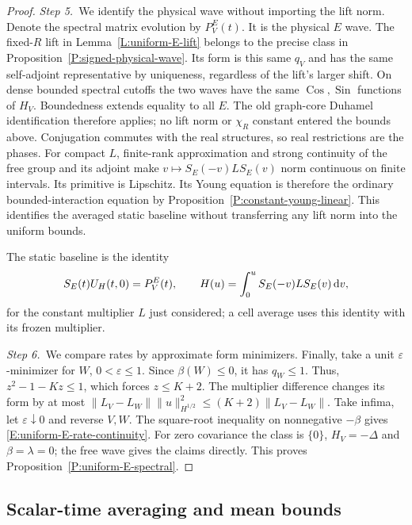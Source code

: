 \begin{proof}
  \medskip
  \noindent\textit{Step 5.~}We identify the physical wave without importing
  the lift norm.
  Denote the spectral matrix evolution by $P_V^E(t)$. It is the physical $E$
  wave. The fixed-$R$ lift in Lemma~\ref{L:uniform-E-lift} belongs to the
  precise class in Proposition~\ref{P:signed-physical-wave}. Its form is this
  same $q_V$ and has the same self-adjoint representative by uniqueness,
  regardless of the lift's larger shift. On dense bounded spectral cutoffs the
  two waves have the same $\operatorname{Cos},\operatorname{Sin}$ functions of
  $H_V$. Boundedness extends equality to all $E$. The old graph-core Duhamel
  identification therefore applies; no lift norm or $\chi_R$ constant entered
  the bounds above. Conjugation commutes with the real structures, so real
  restrictions are the phases. For compact $L$, finite-rank approximation and
  strong continuity of the free group and its adjoint make $v\mapsto
  S_E(-v)LS_E(v)$ norm continuous on finite intervals. Its primitive is
  Lipschitz. Its Young equation is therefore the ordinary bounded-interaction
  equation by Proposition~\ref{P:constant-young-linear}. This identifies the
  averaged static baseline without transferring any lift norm into the uniform
  bounds.


  The static baseline is the identity
  \[
    S_E(t)U_H(t,0)=P_V^E(t),\qquad
    H(u)=\int_0^u S_E(-v)LS_E(v)\,\mathrm{d} v ,
  \]
  for the constant multiplier $L$ just considered; a cell average uses this
  identity with its frozen multiplier.

  \medskip
  \noindent\textit{Step 6.~}We compare rates by approximate form minimizers.
  Finally, take a unit $\varepsilon$-minimizer for $W$, $0 < \varepsilon \le 1$.
  Since $\beta(W) \le 0$, it has $q_W \le 1$. Thus, $z^2-1-Kz \le 1$, which
  forces $z \le K+2$. The multiplier difference changes its form by at most
  $\|L_V-L_W\|\|u\|_{H^{1/2}}^2 \le (K+2)\|L_V-L_W\|$. Take infima, let
  $\varepsilon\downarrow0$ and reverse $V,W$. The square-root inequality on
  nonnegative $-\beta$ gives \eqref{E:uniform-E-rate-continuity}. For zero
  covariance the class is $\{0\}$, $H_V = -\Delta$ and $\beta = \lambda = 0$;
  the free wave gives the claims directly. This proves
  Proposition~\ref{P:uniform-E-spectral}.
\end{proof}

\subsection{Scalar-time averaging and mean bounds}

